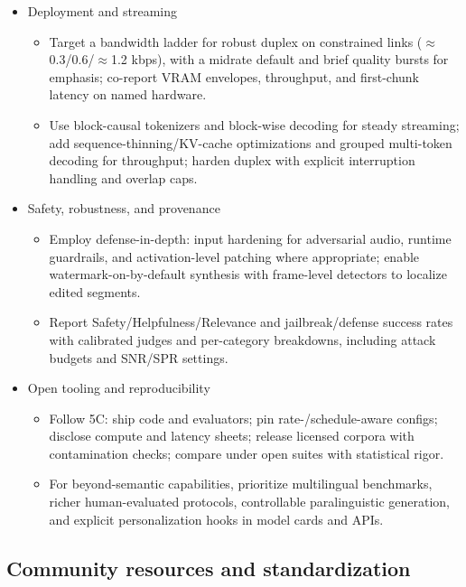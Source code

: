 \documentclass{article}
\begin{document}
\begin{itemize}
  \item Deployment and streaming
  \begin{itemize}
    \item Target a bandwidth ladder for robust duplex on constrained links ($\approx$0.3/0.6/$\approx$1.2 kbps), with a midrate default and brief quality bursts for emphasis; co-report VRAM envelopes, throughput, and first-chunk latency on named hardware.
    \item Use block-causal tokenizers and block-wise decoding for steady streaming; add sequence-thinning/KV-cache optimizations and grouped multi-token decoding for throughput; harden duplex with explicit interruption handling and overlap caps.
  \end{itemize}

  \item Safety, robustness, and provenance
  \begin{itemize}
    \item Employ defense-in-depth: input hardening for adversarial audio, runtime guardrails, and activation-level patching where appropriate; enable watermark-on-by-default synthesis with frame-level detectors to localize edited segments.
    \item Report Safety/Helpfulness/Relevance and jailbreak/defense success rates with calibrated judges and per-category breakdowns, including attack budgets and SNR/SPR settings.
  \end{itemize}

  \item Open tooling and reproducibility
  \begin{itemize}
    \item Follow 5C: ship code and evaluators; pin rate-/schedule-aware configs; disclose compute and latency sheets; release licensed corpora with contamination checks; compare under open suites with statistical rigor.
    \item For beyond-semantic capabilities, prioritize multilingual benchmarks, richer human-evaluated protocols, controllable paralinguistic generation, and explicit personalization hooks in model cards and APIs.
  \end{itemize}

\end{itemize}



\subsection{Community resources and standardization} \label{subsec:Community resources and standardization}
\end{document}
